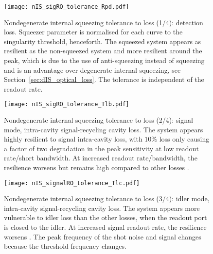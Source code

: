 \begin{figure}
    \centering
    \texttt{[image: nIS\_sigRO\_tolerance\_Rpd.pdf]}
    \caption{  Nondegenerate internal squeezing tolerance to loss (1/4): detection loss. Squeezer parameter is normalised for each curve to the singularity threshold, henceforth. The squeezed system appears as resilient as the non-squeezed system and more resilient around the peak, which is due to the use of anti-squeezing instead of squeezing and is an advantage over degenerate internal squeezing, see Section~\ref{sec:dIS_optical_loss}. The tolerance is independent of the readout rate.}
    \label{fig:nIS_sigRO_tolerance_Rpd}
\end{figure}
\begin{figure}
    \centering
    \texttt{[image: nIS\_sigRO\_tolerance\_Tlb.pdf]}
    \caption{  Nondegenerate internal squeezing tolerance to loss (2/4): signal mode, intra-cavity signal-recycling cavity loss. The system appears highly resilient to signal intra-cavity loss, with $10\%$ loss only causing a factor of two degradation in the peak sensitivity at low readout rate/short bandwidth. At increased readout rate/bandwidth, the resilience worsens but remains high compared to other losses .}
    \label{fig:nIS_sigRO_tolerance_Tlb}
\end{figure}
\begin{figure}
    \centering
    \texttt{[image: nIS\_signalRO\_tolerance\_Tlc.pdf]}
    \caption{ Nondegenerate internal squeezing tolerance to loss (3/4): idler mode, intra-cavity signal-recycling cavity loss. The system appears more vulnerable to idler loss than the other losses, when the readout port is closed to the idler. At increased signal readout rate, the resilience worsens . The peak frequency of the shot noise and signal changes because the threshold frequency changes.}
    \label{fig:nIS_sigRO_tolerance_Tlc}
\end{figure}
